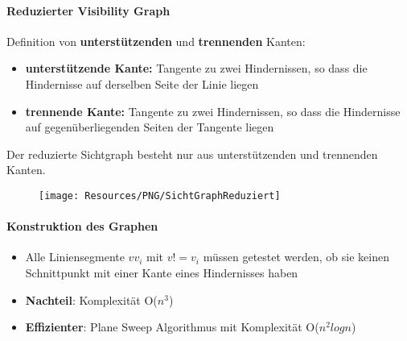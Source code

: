 \paragraph{Reduzierter Visibility Graph}
Definition von \textbf{unterstützenden} und \textbf{trennenden} Kanten:
\begin{itemize}
	\item \textbf{unterstützende Kante:} Tangente zu zwei Hindernissen, so dass die Hindernisse auf derselben Seite der Linie liegen
	\item \textbf{trennende Kante:} Tangente zu zwei Hindernissen, so dass die Hindernisse auf gegenüberliegenden Seiten der Tangente liegen
\end{itemize}
Der reduzierte Sichtgraph besteht nur aus unterstützenden und trennenden Kanten.
\begin{figure}[H]
	\begin{center}
		\texttt{[image: Resources/PNG/SichtGraphReduziert]}
		\caption{}
		\label{fig:PNG/SichtGraphReduziert.PNG}
	\end{center}
\end{figure}
\paragraph{Konstruktion des Graphen}
\begin{itemize}
	\item Alle Liniensegmente $vv_i$ mit $v != v_i$ müssen getestet werden, ob sie keinen Schnittpunkt mit einer Kante eines Hindernisses haben
	\item \textbf{Nachteil}: Komplexität O($n^3$)
	\item \textbf{Effizienter}: Plane Sweep Algorithmus mit Komplexität O($n^2 log n$)
\end{itemize}
